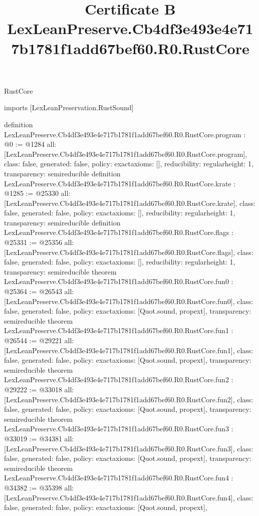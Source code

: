 \begin{lexlean}{RustCore}
\title{Certificate B LexLeanPreserve.Cb4df3e493e4e717b1781f1add67bef60.R0.RustCore}
\begin{coremodule}
imports [LexLeanPreservation.RustSound]

definition LexLeanPreserve.Cb4df3e493e4e717b1781f1add67bef60.R0.RustCore.program : @0 := @1284 {
  all: [LexLeanPreserve.Cb4df3e493e4e717b1781f1add67bef60.R0.RustCore.program],
  class: false,
  generated: false,
  policy: exact{axioms: []},
  reducibility: regular{height: 1},
  transparency: semireducible
}
definition LexLeanPreserve.Cb4df3e493e4e717b1781f1add67bef60.R0.RustCore.krate : @1285 := @25330 {
  all: [LexLeanPreserve.Cb4df3e493e4e717b1781f1add67bef60.R0.RustCore.krate],
  class: false,
  generated: false,
  policy: exact{axioms: []},
  reducibility: regular{height: 1},
  transparency: semireducible
}
definition LexLeanPreserve.Cb4df3e493e4e717b1781f1add67bef60.R0.RustCore.flags : @25331 := @25356 {
  all: [LexLeanPreserve.Cb4df3e493e4e717b1781f1add67bef60.R0.RustCore.flags],
  class: false,
  generated: false,
  policy: exact{axioms: []},
  reducibility: regular{height: 1},
  transparency: semireducible
}
theorem LexLeanPreserve.Cb4df3e493e4e717b1781f1add67bef60.R0.RustCore.fun0 : @25364 := @26543 {
  all: [LexLeanPreserve.Cb4df3e493e4e717b1781f1add67bef60.R0.RustCore.fun0],
  class: false,
  generated: false,
  policy: exact{axioms: [Quot.sound, propext]},
  transparency: semireducible
}
theorem LexLeanPreserve.Cb4df3e493e4e717b1781f1add67bef60.R0.RustCore.fun1 : @26544 := @29221 {
  all: [LexLeanPreserve.Cb4df3e493e4e717b1781f1add67bef60.R0.RustCore.fun1],
  class: false,
  generated: false,
  policy: exact{axioms: [Quot.sound, propext]},
  transparency: semireducible
}
theorem LexLeanPreserve.Cb4df3e493e4e717b1781f1add67bef60.R0.RustCore.fun2 : @29222 := @33018 {
  all: [LexLeanPreserve.Cb4df3e493e4e717b1781f1add67bef60.R0.RustCore.fun2],
  class: false,
  generated: false,
  policy: exact{axioms: [Quot.sound, propext]},
  transparency: semireducible
}
theorem LexLeanPreserve.Cb4df3e493e4e717b1781f1add67bef60.R0.RustCore.fun3 : @33019 := @34381 {
  all: [LexLeanPreserve.Cb4df3e493e4e717b1781f1add67bef60.R0.RustCore.fun3],
  class: false,
  generated: false,
  policy: exact{axioms: [Quot.sound, propext]},
  transparency: semireducible
}
theorem LexLeanPreserve.Cb4df3e493e4e717b1781f1add67bef60.R0.RustCore.fun4 : @34382 := @35398 {
  all: [LexLeanPreserve.Cb4df3e493e4e717b1781f1add67bef60.R0.RustCore.fun4],
  class: false,
  generated: false,
  policy: exact{axioms: [Quot.sound, propext]},
}
\end{coremodule}
\end{lexlean}
